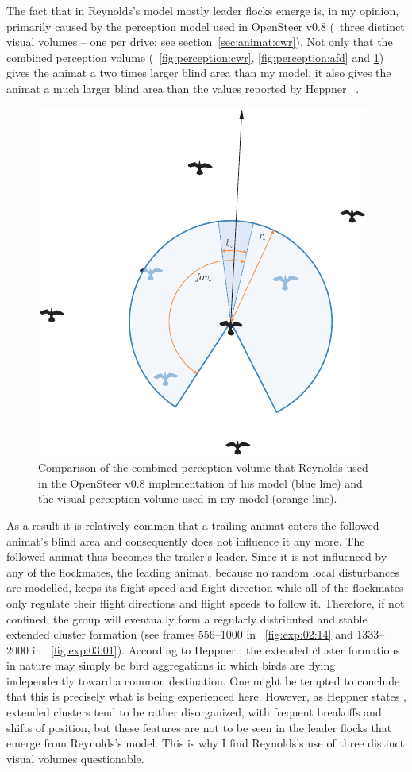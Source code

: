 The fact that in Reynolds's model mostly leader flocks emerge is, in my opinion, primarily caused by the perception model used in OpenSteer v0.8 (\ie\ three distinct visual volumes -- one per drive; see section~\ref{sec:animat:cwr}). Not only that the combined perception volume (\figs~\ref{fig:perception:cwr}, \ref{fig:perception:afd} and \ref{fig:perception}) gives the animat a two times larger blind area than my model, it also gives the animat a much larger blind area than the values reported by Heppner \etal\ \cite{heppner:1985}. 
%
\begin{figure}%
\includegraphics{fig[perception]}
\caption{Comparison of the combined perception volume that Reynolds used in the OpenSteer v0.8 implementation of his model \cite{reynolds:1999} (blue line) and the visual perception volume used in my model (orange line).}
\label{fig:perception}
\end{figure}
%
As a result it is relatively common that a trailing animat enters the followed animat's blind area and consequently does not influence it any more. The followed animat thus becomes the trailer's leader. Since it is not influenced by any of the flockmates, the leading animat, because no random local disturbances are modelled, keeps its flight speed and flight direction while all of the flockmates only regulate their flight directions and flight speeds to follow it. Therefore, if not confined, the group will eventually form a regularly distributed and stable extended cluster formation (see frames 556--1000 in \fig~\ref{fig:exp:02:14} and 1333--2000 in \fig~\ref{fig:exp:03:01}). According to Heppner \cite{heppner:1974a}, the extended cluster formations in nature may simply be bird aggregations in which birds are flying independently toward a common destination. One might be tempted to conclude that this is precisely what is being experienced here. However, as Heppner states \cite{heppner:1974a}, extended clusters tend to be rather disorganized, with frequent breakoffs and shifts of position, but these features are not to be seen in the leader flocks that emerge from Reynolds's model. This is why I find Reynolds's use of three distinct visual volumes questionable.

